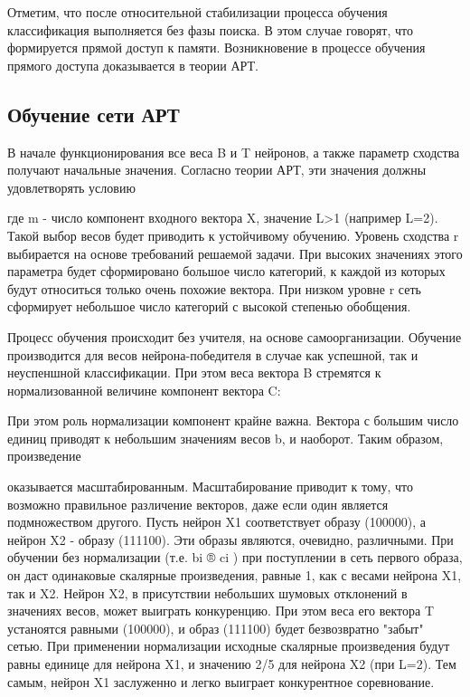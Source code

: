 \documentclass[12pt,a4paper,article]{article}
\begin{document}
Отметим, что после относительной стабилизации процесса обучения классификация выполняется без фазы поиска. В этом случае говорят, что формируется прямой доступ к памяти. Возникновение в процессе обучения прямого доступа доказывается в теории АРТ.

\subsection{Обучение сети АРТ}
В начале функционирования все веса B и T нейронов, а также параметр сходства получают начальные значения. Согласно теории АРТ, эти значения должны удовлетворять условию



где m - число компонент входного вектора X, значение L>1 (например L=2). Такой выбор весов будет приводить к устойчивому обучению. Уровень сходства r выбирается на основе требований решаемой задачи. При высоких значениях этого параметра будет сформировано большое число категорий, к каждой из которых будут относиться только очень похожие вектора. При низком уровне r сеть сформирует небольшое число категорий с высокой степенью обобщения.

Процесс обучения происходит без учителя, на основе самоорганизации. Обучение производится для весов нейрона-победителя в случае как успешной, так и неуспеншной классификации. При этом веса вектора B стремятся к нормализованной величине компонент вектора C:



При этом роль нормализации компонент крайне важна. Вектора с большим число единиц приводят к небольшим значениям весов b, и наоборот. Таким образом, произведение



оказывается масштабированным. Масштабирование приводит к тому, что возможно правильное различение векторов, даже если один является подмножеством другого. Пусть нейрон X1 соответствует образу (100000), а нейрон X2 - образу (111100). Эти образы являются, очевидно, различными. При обучении без нормализации (т.е. bi ® ci ) при поступлении в сеть первого образа, он даст одинаковые скалярные произведения, равные 1, как с весами нейрона X1, так и X2. Нейрон X2, в присутствии небольших шумовых отклонений в значениях весов, может выиграть конкуренцию. При этом веса его вектора T устаноятся равными (100000), и образ (111100) будет безвозвратно "забыт" сетью.
При применении нормализации исходные скалярные произведения будут равны единице для нейрона X1, и значению 2/5 для нейрона X2 (при L=2). Тем самым, нейрон X1 заслуженно и легко выиграет конкурентное соревнование.
\end{document}
